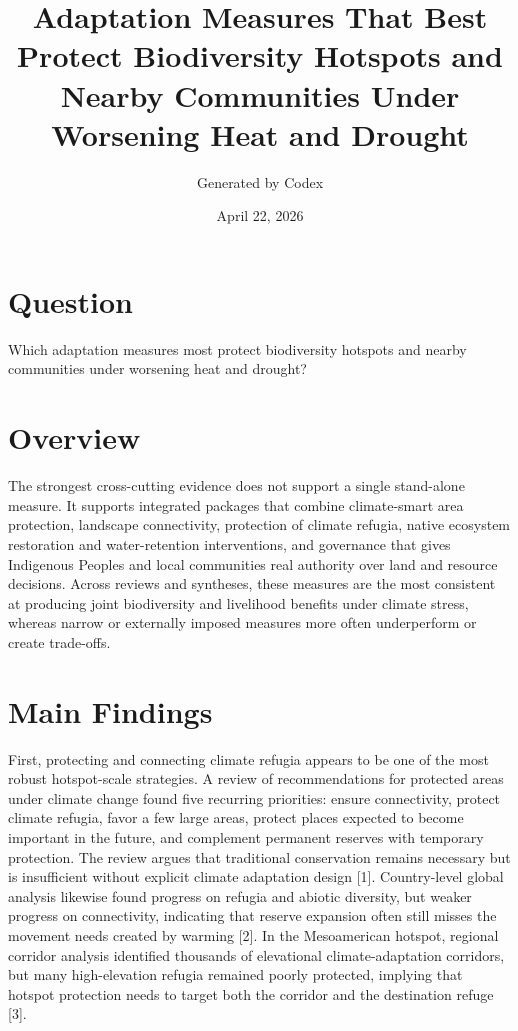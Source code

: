\documentclass[11pt]{article}
\title{Adaptation Measures That Best Protect Biodiversity Hotspots and Nearby Communities Under Worsening Heat and Drought}
\author{Generated by Codex}
\date{April 22, 2026}
\begin{document}
\maketitle

\section{Question}
Which adaptation measures most protect biodiversity hotspots and nearby communities under worsening heat and drought?

\section{Overview}
The strongest cross-cutting evidence does not support a single stand-alone measure. It supports integrated packages that combine climate-smart area protection, landscape connectivity, protection of climate refugia, native ecosystem restoration and water-retention interventions, and governance that gives Indigenous Peoples and local communities real authority over land and resource decisions. Across reviews and syntheses, these measures are the most consistent at producing joint biodiversity and livelihood benefits under climate stress, whereas narrow or externally imposed measures more often underperform or create trade-offs.

\section{Main Findings}
First, protecting and connecting climate refugia appears to be one of the most robust hotspot-scale strategies. A review of recommendations for protected areas under climate change found five recurring priorities: ensure connectivity, protect climate refugia, favor a few large areas, protect places expected to become important in the future, and complement permanent reserves with temporary protection. The review argues that traditional conservation remains necessary but is insufficient without explicit climate adaptation design [1]. Country-level global analysis likewise found progress on refugia and abiotic diversity, but weaker progress on connectivity, indicating that reserve expansion often still misses the movement needs created by warming [2]. In the Mesoamerican hotspot, regional corridor analysis identified thousands of elevational climate-adaptation corridors, but many high-elevation refugia remained poorly protected, implying that hotspot protection needs to target both the corridor and the destination refuge [3].
\end{document}
